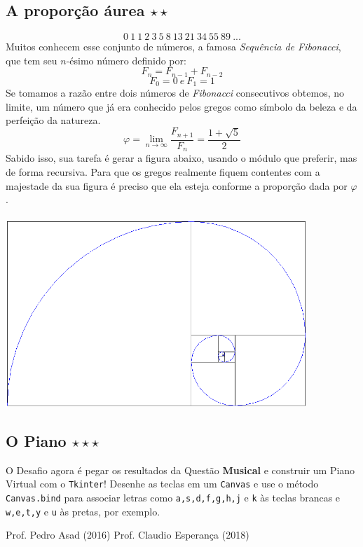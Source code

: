 \documentclass[12pt]{article}
\newcommand{\mono}[1]{\texttt{#1}}
\begin{document}
	\subsection{A proporção áurea $\star\star$}
	\[0\ 1\ 1\ 2\ 3\ 5\ 8\ 13\ 21\ 34\ 55\ 89\ ... \]	
	Muitos conhecem esse conjunto de números, a famosa \emph{Sequência de Fibonacci}, que tem seu $n$-ésimo número definido por:
	\[F_{n} = F_{n-1} + F_{n-2}\]
	\[F_{0} = 0 \ e \ F_{1} = 1\]
	Se tomamos a razão entre dois números de \emph{Fibonacci} consecutivos obtemos, no limite, um número que já era conhecido pelos gregos como símbolo da beleza e da perfeição da natureza.
	\[\varphi = \lim_{n \to \infty} \frac{F_{n+1}}{F_{n}}= \frac{1+\sqrt{5}}{2} \]
	Sabido isso, sua tarefa é gerar a figura abaixo, usando o módulo que preferir, mas de forma recursiva. Para que os gregos realmente fiquem contentes com a majestade da sua figura é preciso que ela esteja conforme a proporção dada por $\varphi$.\\\\
	\includegraphics[height=200pt]{golden_ratio.png}
	
	\subsection{O Piano $\star\star\star$}
	O Desafio agora é pegar os resultados da Questão {\bf Musical} e construir um Piano Virtual com o \mono{Tkinter}! Desenhe as teclas em um \mono{Canvas} e use o método \mono{Canvas.bind} para associar letras como \mono{a,s,d,f,g,h,j} e \mono{k} às teclas brancas e \mono{w,e,t,y} e \mono{u} às pretas, por exemplo.
	
	\begin{thebibliography}{99}
	 Prof. Pedro Asad (2016)
	 Prof. Claudio Esperança (2018)
	\end{thebibliography}
\end{document}
